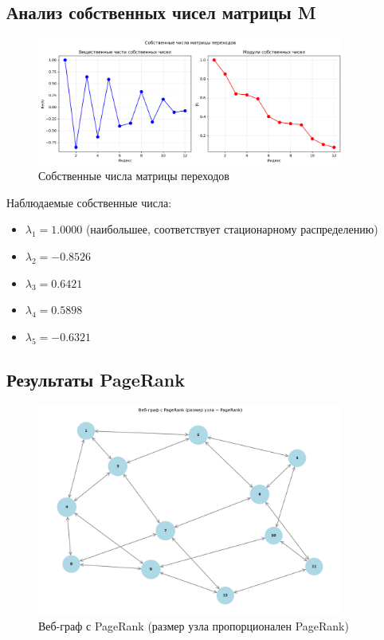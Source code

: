 \subsection*{Анализ собственных чисел матрицы M}

\begin{figure}[H]
    \centering
    \includegraphics[width=0.9\textwidth]{images/task2/eigenvalues.png}
    \caption{Собственные числа матрицы переходов}
\end{figure}

Наблюдаемые собственные числа:
\begin{itemize}
    \item $\lambda_1 = 1.0000$ (наибольшее, соответствует стационарному распределению)
    \item $\lambda_2 = -0.8526$
    \item $\lambda_3 = 0.6421$
    \item $\lambda_4 = 0.5898$
    \item $\lambda_5 = -0.6321$
\end{itemize}

\subsection*{Результаты PageRank}

\begin{figure}[H]
    \centering
    \includegraphics[width=0.9\textwidth]{images/task2/pagerank_result.png}
    \caption{Веб-граф с PageRank (размер узла пропорционален PageRank)}
\end{figure}

